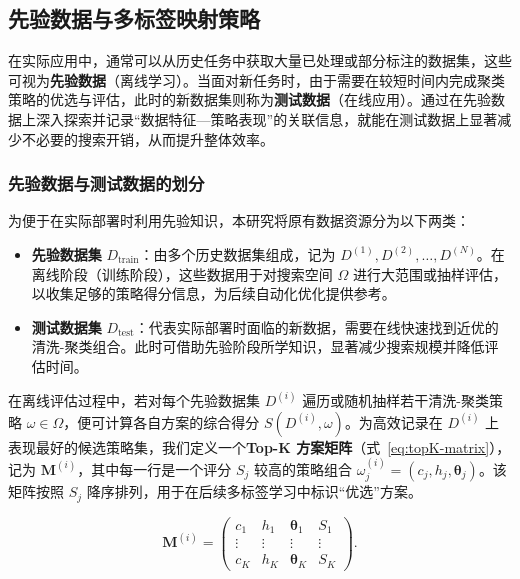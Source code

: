\documentclass[10pt]{article} %
\numberwithin{equation}{section}
\begin{document}
\subsection{先验数据与多标签映射策略}
\label{sec:prior-data-mapping}


在实际应用中，通常可以从历史任务中获取大量已处理或部分标注的数据集，这些可视为\textbf{先验数据}（离线学习）。当面对新任务时，由于需要在较短时间内完成聚类策略的优选与评估，此时的新数据集则称为\textbf{测试数据}（在线应用）。通过在先验数据上深入探索并记录“数据特征—策略表现”的关联信息，就能在测试数据上显著减少不必要的搜索开销，从而提升整体效率。

\subsubsection{先验数据与测试数据的划分}
\label{subsec:dataset-split}

为便于在实际部署时利用先验知识，本研究将原有数据资源分为以下两类：
\begin{itemize}
    \item \textbf{先验数据集} $D_{\text{train}}$：由多个历史数据集组成，记为 ${D^{(1)}, D^{(2)}, \dots, D^{(N)}}$。在离线阶段（训练阶段），这些数据用于对搜索空间 $\Omega$ 进行大范围或抽样评估，以收集足够的策略得分信息，为后续自动化优化提供参考。
    \item \textbf{测试数据集} $D_{\text{test}}$：代表实际部署时面临的新数据，需要在线快速找到近优的清洗-聚类组合。此时可借助先验阶段所学知识，显著减少搜索规模并降低评估时间。
\end{itemize}

在离线评估过程中，若对每个先验数据集 $D^{(i)}$ 遍历或随机抽样若干清洗-聚类策略 $\omega \in \Omega$，便可计算各自方案的综合得分 $S(D^{(i)}, \omega)$。为高效记录在 $D^{(i)}$ 上表现最好的候选策略集，我们定义一个\textbf{Top-K 方案矩阵}（式~\eqref{eq:topK-matrix}），记为 $\mathbf{M}^{(i)}$，其中每一行是一个评分 $S_j$ 较高的策略组合 $\omega_j^{(i)}=(c_j,h_j,\boldsymbol{\theta}_j)$。该矩阵按照 $S_j$ 降序排列，用于在后续多标签学习中标识“优选”方案。

\begin{equation}\label{eq:topK-matrix}
\mathbf{M}^{(i)} 
= 
\begin{pmatrix}
c_1 & h_1 & \boldsymbol{\theta}_1 & S_1 \\
\vdots & \vdots & \vdots & \vdots \\
c_K & h_K & \boldsymbol{\theta}_K & S_K
\end{pmatrix}.
\end{equation}
\end{document}

